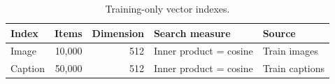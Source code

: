 \begin{table}[htbp]
\centering
\caption{Training-only vector indexes.}
\label{tab:index-summary}
\begin{tabularx}{\textwidth}{@{}lrrXl@{}}
\toprule
\textbf{Index} & \textbf{Items} & \textbf{Dimension} & \textbf{Search measure} & \textbf{Source}\\
\midrule
Image & 10,000 & 512 & Inner product = cosine & Train images\\
Caption & 50,000 & 512 & Inner product = cosine & Train captions\\
\bottomrule
\end{tabularx}
\end{table}
